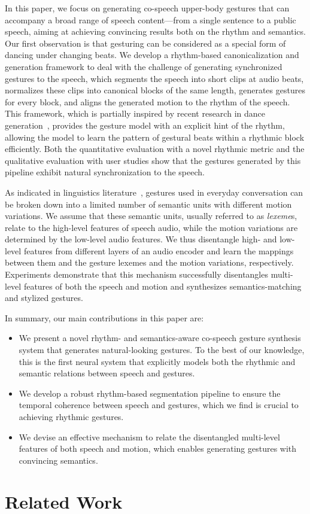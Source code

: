 \documentclass[acmtog,authorversion]{acmart}
\begin{document}
In this paper, we focus on generating co-speech upper-body gestures that can accompany a broad range of speech content---from a single sentence to a public speech, aiming at achieving convincing results both on the rhythm and semantics. Our first observation is that gesturing can be considered as a special form of dancing under changing beats. We develop a rhythm-based canonicalization and generation framework to deal with the challenge of generating synchronized gestures to the speech, which segments the speech into short clips at audio beats, normalizes these clips into canonical blocks of the same length, generates gestures for every block, and aligns the generated motion to the rhythm of the speech. This framework, which is partially inspired by recent research in dance generation~\cite{aristidou2021rhythm}, provides the gesture model with an explicit hint of the rhythm, allowing the model to learn the pattern of gestural beats within a rhythmic block efficiently. Both the quantitative evaluation with a novel rhythmic metric and the qualitative evaluation with user studies show that the gestures generated by this pipeline exhibit natural synchronization to the speech.

As indicated in linguistics literature~\cite{Kipp2004_Gesture,Neff2008Gesture,Webb1996_Linguistic}, gestures used in everyday conversation can be broken down into a limited number of semantic units with different motion variations. We assume that these semantic units, usually referred to as \emph{lexeme}s, relate to the high-level features of speech audio, while the motion variations are determined by the low-level audio features. We thus disentangle high- and low-level features from different layers of an audio encoder and learn the mappings between them and the gesture lexemes and the motion variations, respectively. Experiments demonstrate that this mechanism successfully disentangles multi-level features of both the speech and motion and synthesizes semantics-matching and stylized gestures.

In summary, our main contributions in this paper are:
\begin{itemize}
    \item We present a novel rhythm- and semantics-aware co-speech gesture synthesis system that generates natural-looking gestures. To the best of our knowledge, this is the first neural system that explicitly models both the rhythmic and semantic relations between speech and gestures.
    \item We develop a robust rhythm-based segmentation pipeline to ensure the temporal coherence between speech and gestures, which we find is crucial to achieving rhythmic gestures.
    \item We devise an effective mechanism to relate the disentangled multi-level features of both speech and motion, which enables generating gestures with convincing semantics.
\end{itemize} \section{Related Work}
\label{sec:related_work}
\end{document}
